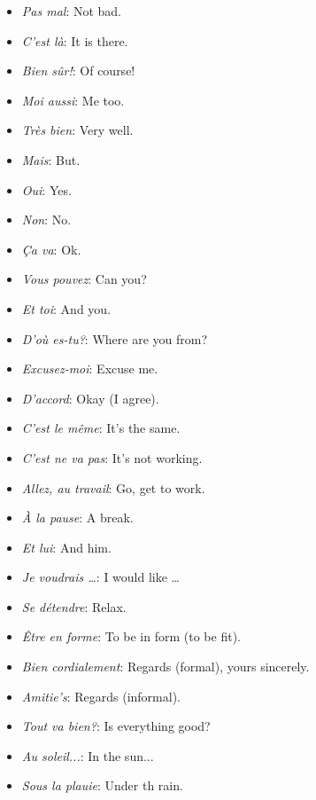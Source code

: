 \begin{itemize}
\item{\emph{Pas mal}: Not bad.}

\item{\emph{C'est l\`a}: It is there.}

\item{\emph{Bien s\^ur!}: Of course!}

\item{\emph{Moi aussi}: Me too.}

\item{\emph{Tr\`es bien}: Very well.}

\item{\emph{Mais}: But.}

\item{\emph{Oui}: Yes.}

\item{\emph{Non}: No.}

\item{\emph{\c{C}a va}: Ok.}

\item{\emph{Vous pouvez}: Can you?}

\item{\emph{Et toi}: And you.}

\item{\emph{D'o\`u es-tu?}: Where are you from?}

\item{\emph{Excusez-moi}: Excuse me.}

\item{\emph{D'accord}: Okay (I agree).}

\item{\emph{C'est le m\^eme}: It's the same.}

\item{\emph{C'est ne va pas}: It's not working.}

\item{\emph{Allez, au travail}: Go, get to work.}

\item{\emph{\`A la pause}: A break.}

\item{\emph{Et lui}: And him.}

\item{\emph{Je voudrais \dots}: I would like \dots}

\item{\emph{Se d\'etendre}: Relax.}

\item{\emph{\^Etre en forme}: To be in form (to be fit).}

\item{\emph{Bien cordialement}: Regards (formal), yours sincerely.}

\item{\emph{Amitie's}: Regards (informal).}

\item{\emph{Tout va bien?}: Is everything good?}

\item{\emph{Au soleil...}: In the sun...}

\item{\emph{Sous la plauie}: Under th rain.}




\end{itemize}
